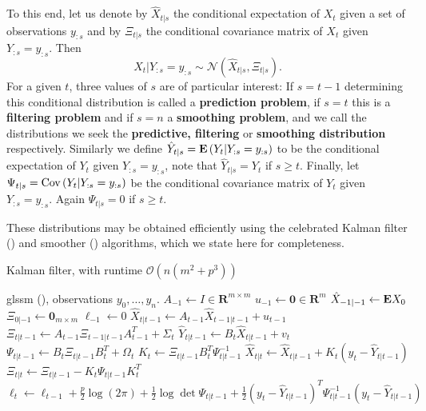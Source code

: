 To this end, let us denote by $\hat X_{t | s}$ the conditional expectation of $X_{t}$ given a set of observations $y_{:s}$ and by $\Xi_{t | s}$ the conditional covariance matrix of $X_{t}$ given $Y_{:s} = y_{:s}$. Then $$X_{t} | Y_{:s} = y_{:s} \sim \mathcal N \left( \hat X_{t|s}, \Xi_{t|s} \right).$$ For a given $t$, three values of $s$ are of particular interest: If $s = t - 1$ determining this conditional distribution is called a \textbf{prediction problem}, if $s = t$ this is a \textbf{filtering problem} and if $s = n$ a \textbf{smoothing problem}, and we call the distributions we seek the \textbf{predictive, filtering} or \textbf{smoothing distribution} respectively. 
Similarly we define $\hat Y_{t|s} = \mathbf E \left( Y_{t} \middle| Y_{:s} = y_{:s} \right)$ to be the conditional expectation of $Y_{t}$ given $Y_{:s}=y_{:s}$, note that $\hat Y_{t|s} = Y_{t}$ if $s \geq t$. Finally, let $\Psi_{t|s} = \text{Cov} \left( Y_{t} | Y_{:s} = y_{:s} \right)$ be the conditional covariance matrix of $Y_{t}$ given $Y_{:s} = y_{:s}$. Again $\Psi_{t|s} = 0$ if $s \geq t$. 

These distributions may be obtained efficiently using the celebrated Kalman filter () and smoother () algorithms, which we state here for completeness.

\begin{algorithm}
    \caption{Kalman filter, with runtime $\mathcal O(n(m^{2} + p^{3}))$}
    \label{alg:kalman_filter}
    \begin{algorithmic}
        \Require \gls{glssm} (), observations $y_{0}, \dots, y_{n}$.
        \State $A_{-1} \gets I \in \mathbf R^{m\times m}$ 
        \State $u_{-1} \gets \mathbf 0 \in \mathbf R^{m}$ 
        \State $\hat X_{-1|-1} \gets \mathbf E X_0$
        \State $\Xi_{0|-1} \gets \mathbf 0_{m\times m}$
        \State $\ell_{-1} \gets 0$
            \State $\hat X_{t| t - 1} \gets A_{t-1} \hat X_{t-1|t-1} + u_{t-1}$ 
            \State $\Xi_{t | t - 1} \gets A_{t - 1} \Xi_{t - 1 | t - 1 } A_{t - 1}^{T} + \Sigma_{t}$ 
            \State $\hat Y_{t|t - 1} \gets B_{t}\hat X_{t | t - 1} + v_{t}$
            \State $\Psi_{t|t - 1} \gets B_{t}\Xi_{t | t - 1} B_{t}^T + \Omega_{t}$
            \State $K_t \gets \Xi_{t | t - 1} B_{t}^T \Psi_{t | t - 1} ^{-1}$ 
            \State $\hat X_{t | t} \gets \hat X_{t | t - 1} + K_t (y_{t} - \hat Y_{t | t - 1})$
            \State $\Xi_{t| t } \gets \Xi_{t | t - 1} - K_t \Psi_{t| t - 1} K_t^T$
            \State $\ell_{t} \gets \ell_{t - 1} + \frac{p}{2} \log (2\pi) + \frac{1}{2}\log\det \Psi_{t|t -1} + \frac{1}{2} \left( y_{t} - \hat Y_{t | t - 1} \right)^{T} \Psi_{t|t-1}^{-1} \left( y_{t} - \hat Y_{t | t - 1} \right) $ 
        \EndFor
    \end{algorithmic}
\end{algorithm}

